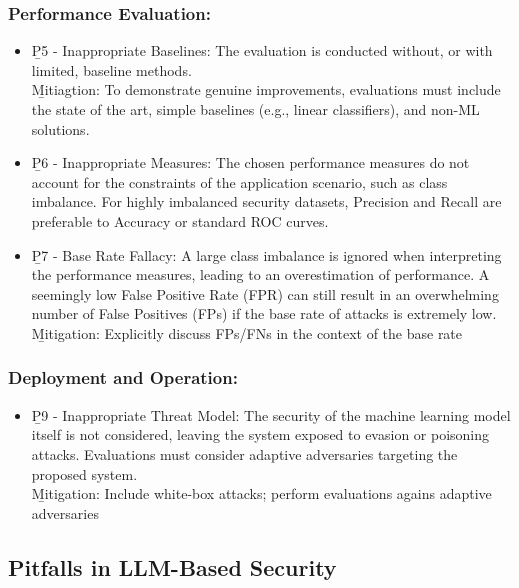 \subsubsection*{Performance Evaluation:}
\begin{itemize}
    \item \b{P5 - Inappropriate Baselines}: The evaluation is conducted without, or with limited, baseline methods.\\[.5em]
    \b{Mitiagtion}: To demonstrate genuine improvements, evaluations must include the state of the art, simple baselines (e.g., linear classifiers), and non-ML solutions.
    \item \b{P6 - Inappropriate Measures}: The chosen performance measures do not account for the constraints of the application scenario, such as class imbalance. For highly imbalanced security datasets, Precision and Recall are preferable to Accuracy or standard ROC curves.
    \item \b{P7 - Base Rate Fallacy}: A large class imbalance is ignored when interpreting the performance measures, leading to an overestimation of performance. A seemingly low False Positive Rate (FPR) can still result in an overwhelming number of False Positives (FPs) if the base rate of attacks is extremely low.\\[.5em]
    \b{Mitigation}: Explicitly discuss FPs/FNs in the context of the base rate
\end{itemize}


\subsubsection*{Deployment and Operation:}
\begin{itemize}
    \item \b{P9 - Inappropriate Threat Model}: The security of the machine learning model itself is not considered, leaving the system exposed to evasion or poisoning attacks. Evaluations must consider adaptive adversaries targeting the proposed system.\\[.5em]
    \b{Mitigation}: Include white-box attacks; perform evaluations agains adaptive adversaries
\end{itemize}



\subsection{Pitfalls in LLM-Based Security}

